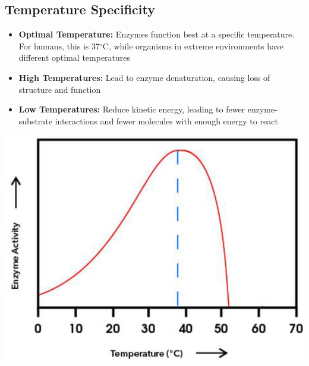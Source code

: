 \documentclass[10pt]{article}
\begin{document}
\subsection*{Temperature Specificity}
\begin{itemize}
    \item \textbf{Optimal Temperature:} Enzymes function best at a specific temperature.  For humans, this is 37$^\circ$C, while organisms in extreme environments have different optimal temperatures
    \item \textbf{High Temperatures:} Lead to enzyme denaturation, causing loss of structure and function
    \item \textbf{Low Temperatures:} Reduce kinetic energy, leading to fewer enzyme-substrate interactions and fewer molecules with enough energy to react
\end{itemize}
\begin{center}
    \includegraphics*[scale=0.6]{L1_16.png}
\end{center}
\end{document}
